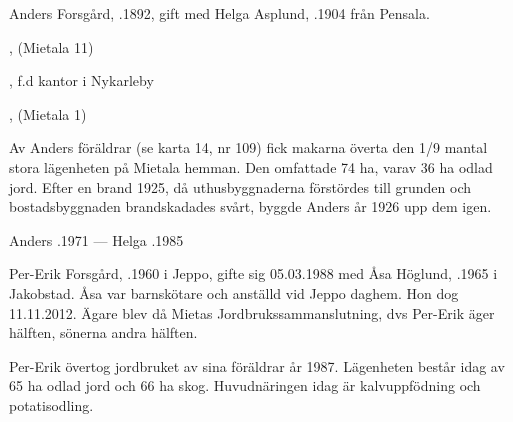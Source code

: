 %
Anders Forsgård, .1892, gift med Helga Asplund, .1904 från Pensala.
\begin{jhchildren}
  \item {}, (Mietala 11)
  \item {}, f.d kantor i Nykarleby
  \item {}, (Mietala  1)
  \item {}
  \item {}
\end{jhchildren}

Av Anders föräldrar (se karta 14, nr 109) fick makarna överta den 1/9 mantal stora lägenheten på Mietala hemman. Den omfattade 74 ha, varav 36 ha odlad jord. Efter en brand 1925, då uthusbyggnaderna förstördes till grunden och  bostadsbyggnaden  brandskadades svårt, byggde Anders år 1926 upp dem igen.

Anders .1971  ---  Helga .1985





%



%
Per-Erik Forsgård, .1960 i Jeppo, gifte sig 05.03.1988 med Åsa Höglund, .1965 i Jakobstad. Åsa var barnskötare och anställd vid Jeppo daghem. Hon dog 11.11.2012. Ägare blev då Mietas Jordbrukssammanslutning, dvs Per-Erik äger hälften, sönerna andra hälften.
\begin{jhchildren}
  \item {}
  \item {}
\end{jhchildren}

Per-Erik övertog jordbruket av sina föräldrar år 1987. Lägenheten består idag av 65 ha odlad jord och 66 ha skog. Huvudnäringen idag är kalvuppfödning och potatisodling.

